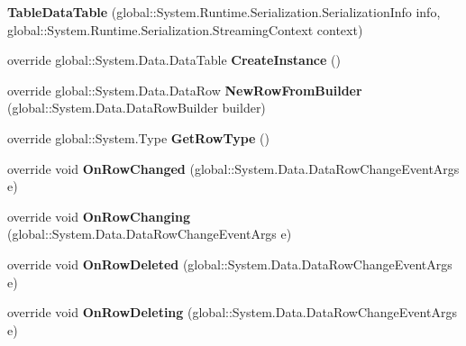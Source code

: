 \begin{DoxyCompactItemize}
\item 
\mbox{\label{classprojekt__grupowy_1_1database_data_set_1_1_table_data_table_aa917c48c22b6e990d5c7a8290e6f182a}} 
{\bfseries Table\+Data\+Table} (global\+::\+System.\+Runtime.\+Serialization.\+Serialization\+Info info, global\+::\+System.\+Runtime.\+Serialization.\+Streaming\+Context context)
\item 
\mbox{\label{classprojekt__grupowy_1_1database_data_set_1_1_table_data_table_a83bb3a37743479e695dbf2be7b160b53}} 
override global\+::\+System.\+Data.\+Data\+Table {\bfseries Create\+Instance} ()
\item 
\mbox{\label{classprojekt__grupowy_1_1database_data_set_1_1_table_data_table_a1104d7433b495ddfc1c5bccd456f963e}} 
override global\+::\+System.\+Data.\+Data\+Row {\bfseries New\+Row\+From\+Builder} (global\+::\+System.\+Data.\+Data\+Row\+Builder builder)
\item 
\mbox{\label{classprojekt__grupowy_1_1database_data_set_1_1_table_data_table_a3a5ca351995239d4e2dbdd1d44e28916}} 
override global\+::\+System.\+Type {\bfseries Get\+Row\+Type} ()
\item 
\mbox{\label{classprojekt__grupowy_1_1database_data_set_1_1_table_data_table_aed502d96df01aea981e69f60eebe8cec}} 
override void {\bfseries On\+Row\+Changed} (global\+::\+System.\+Data.\+Data\+Row\+Change\+Event\+Args e)
\item 
\mbox{\label{classprojekt__grupowy_1_1database_data_set_1_1_table_data_table_a717bb54f7bcf5d92ac22306ac5448452}} 
override void {\bfseries On\+Row\+Changing} (global\+::\+System.\+Data.\+Data\+Row\+Change\+Event\+Args e)
\item 
\mbox{\label{classprojekt__grupowy_1_1database_data_set_1_1_table_data_table_a94725a716824efcfe95c41cdfcf15afa}} 
override void {\bfseries On\+Row\+Deleted} (global\+::\+System.\+Data.\+Data\+Row\+Change\+Event\+Args e)
\item 
\mbox{\label{classprojekt__grupowy_1_1database_data_set_1_1_table_data_table_aed8df39c3436c3e3cd9969f5b40de6c1}} 
override void {\bfseries On\+Row\+Deleting} (global\+::\+System.\+Data.\+Data\+Row\+Change\+Event\+Args e)
\end{DoxyCompactItemize}
